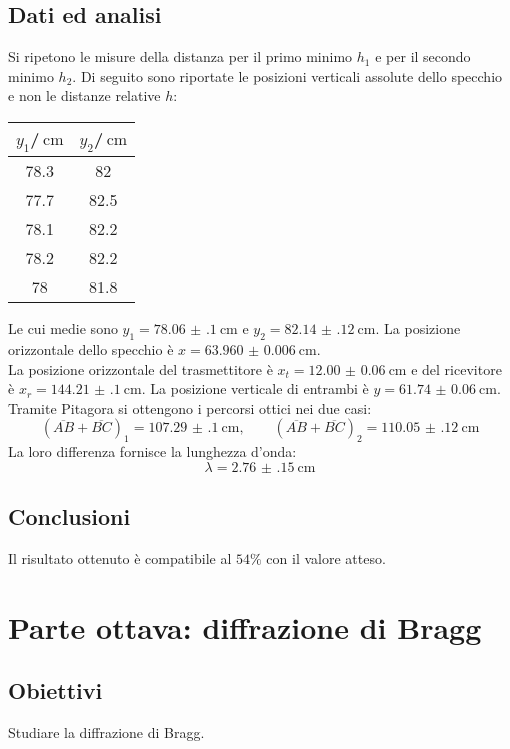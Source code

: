 \documentclass[a4paper]{article}
\begin{document}
\subsection{Dati ed analisi}
Si ripetono le misure della distanza per il primo minimo $h_1$ e per il secondo minimo $h_2$. Di seguito sono riportate le posizioni verticali assolute dello specchio e non le distanze relative $h$:
\begin{center}
\begin{tabular}[h]{c|c}
	$y_1$/$\SI{}{\cm}$ & $y_2$/$\SI{}{\cm}$ \\\midrule
	\SI{78.3}{} & \SI{82}{} \\
	\SI{77.7}{} & \SI{82.5}{} \\
	\SI{78.1}{} & \SI{82.2}{} \\
	\SI{78.2}{} & \SI{82.2}{} \\
	\SI{78}{} & \SI{81.8}{}
\end{tabular}
\end{center}
Le cui medie sono $y_1=\SI{78.06(10)}{\cm}$ e $y_2=\SI{82.14(12)}{\cm}$. La posizione orizzontale dello specchio è $x=\SI{63.960(6)}{\cm}$.\\
La posizione orizzontale del trasmettitore è $x_t=\SI{12.00(6)}{\cm}$ e del ricevitore è $x_r=\SI{144.21(10)}{\cm}$. La posizione verticale di entrambi è $y=\SI{61.74(6)}{\cm}$.\\
Tramite Pitagora si ottengono i percorsi ottici nei due casi:
\[
	(\overline{AB}+\overline{BC})_1 = \SI{107.29(10)}{\cm},\qquad (\overline{AB}+\overline{BC})_2=\SI{110.05(12)}{\cm}
\] 
La loro differenza fornisce la lunghezza d'onda:
\[
\lambda=\SI{2.76(15)}{\cm}
\] 

\subsection{Conclusioni}
Il risultato ottenuto è compatibile al $54\%$ con il valore atteso.


\clearpage
\section{Parte ottava: diffrazione di Bragg}
\subsection{Obiettivi}
Studiare la diffrazione di Bragg.
\end{document}
